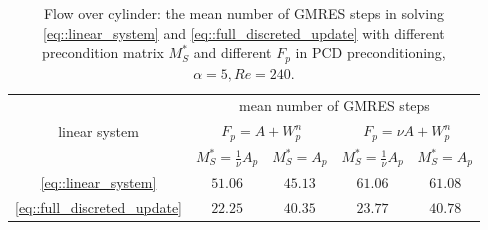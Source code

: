 \documentclass{eajam}
\begin{document}
       \begin{table}[!htbp]
         \centering
         \begin{tabular}{ccccc}
           \toprule
           \multirow{3}{*}{linear system}   &  \multicolumn{4}{c}{mean
             number of GMRES steps} \\
           \cline{2-5}
                           & \multicolumn{2}{c}{$F_p = A + W_p^n $} &
                           \multicolumn{2}{c}{$F_p = \nu A + W_p^n $} \\ \midrule
                           & $M_S^* = \frac{1}{\nu}A_p$&  $M_S^* = A_p$ & $M_S^* = \frac{1}{\nu}A_p$  &  $M_S^* = A_p$   \\ \midrule
           \eqref{eq::linear_system}         & $51.06$   & $ 45.13$ &
           $ 61.06 $   & $61.08$  \\ \midrule           
           \eqref{eq::full_discreted_update} & $22.25$   & $40.35$  & $ 23.77 $   & $40.78$ 
           \\ \bottomrule 
         \end{tabular}
         \caption{Flow over cylinder: the mean number of GMRES steps in solving
           \eqref{eq::linear_system} and \eqref{eq::full_discreted_update} with different precondition
           matrix $M_S^*$ and different $F_p$ in PCD preconditioning,
           $\alpha = 5, Re = 240$.}
         \label{tab::GMRES_steps_cylinder}
       \end{table}
      
\end{document}
